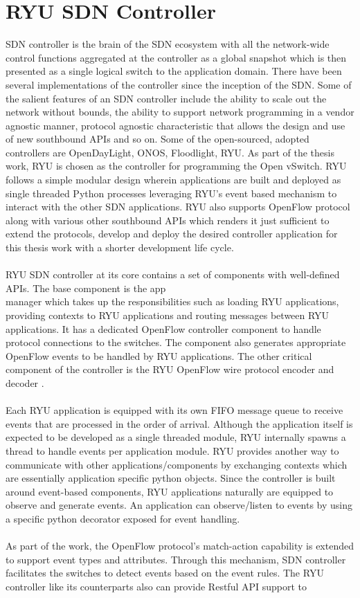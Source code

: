 \section{RYU SDN Controller}
SDN controller is the brain of the SDN ecosystem with all the network-wide control functions aggregated at the controller as a global snapshot which is then presented as a single logical switch to the application domain.  There have been several implementations of the controller since the inception of the SDN. Some of the salient features of an SDN controller include the ability to scale out the network without bounds, the ability to support network programming in a vendor agnostic manner, protocol agnostic characteristic that allows the design and use of new southbound APIs and so on.  Some of the open-sourced, adopted controllers are OpenDayLight, ONOS, Floodlight, RYU. As part of the thesis work, RYU is chosen as the controller for programming the Open vSwitch. RYU follows a simple modular design wherein applications are built and deployed as single threaded Python processes leveraging RYU's event based mechanism to interact with the other SDN applications. RYU also supports OpenFlow protocol along with various other southbound APIs which renders it just sufficient to extend the protocols, develop and deploy the desired controller application for this thesis work with a shorter development life cycle.\\\\RYU SDN controller at its core contains a set of components with well-defined APIs. The base component is the app\\manager which takes up the responsibilities such as loading RYU applications, providing contexts to RYU applications and routing messages between RYU applications. It has a dedicated OpenFlow controller component to handle protocol connections to the switches. The component also generates appropriate OpenFlow events to be handled by RYU applications. The other critical component of the controller is the RYU OpenFlow wire protocol encoder and decoder \cite{RYU-Documentation}.\\\\Each RYU application is equipped with its own FIFO message queue to receive events that are processed in the order of arrival. Although the application itself is expected to be developed as a single threaded module, RYU internally spawns a thread to handle events per application module. RYU provides another way to communicate with other applications/components by exchanging contexts which are essentially application specific python objects. Since the controller is built around event-based components, RYU applications naturally are equipped to observe and generate events. An application can observe/listen to events by using a specific python decorator exposed for event handling.\\\\ As part of the work, the OpenFlow protocol's match-action capability is extended to support event types and attributes. Through this mechanism, SDN controller facilitates the switches to detect events based on the event rules. The RYU controller like its counterparts also can provide Restful API support to 